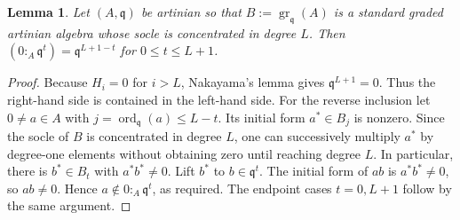 \documentclass[11pt,a4paper]{amsart}
\numberwithin{equation}{section}
\newtheorem{lemma}[theorem]{Lemma}
\newcommand{\gr}{\operatorname{gr}}
\newcommand{\ord}{\operatorname{ord}}
\begin{document}
 \begin{lemma} \label{lem:filtered}
 	Let $(A,\mathfrak q)$ be  artinian  so that
 	$B:=\gr_{\mathfrak q}(A)$ is a standard graded artinian algebra
 	whose socle is concentrated in degree $L$.
 	Then
 	$ (	0:_A\mathfrak q^t)=\mathfrak q^{L+1-t}$
 	for $0\leq t\leq L+1$.
 \end{lemma}
 \begin{proof}
 	Because $H_i=0$ for $i>L$, Nakayama's lemma gives
 	$\mathfrak q^{L+1}=0$.  Thus the right-hand side is contained
 	in the left-hand side.  For the reverse inclusion let
 	$0\neq a\in A$ with $j=\ord_{\mathfrak q}(a)\leq L-t$.
 	Its initial form $a^*\in B_j$ is nonzero.  Since the socle
 	of $B$ is concentrated in degree $L$, one can successively
 	multiply $a^*$ by degree-one elements without obtaining zero
 	until reaching degree $L$.  In particular, there is
 	$b^*\in B_t$ with $a^*b^*\neq0$.
 	Lift $b^*$ to $b\in\mathfrak q^t$.  The initial form of $ab$
 	is $a^*b^*\neq0$, so $ab\neq0$.
 	Hence $a\notin0:_A\mathfrak q^t$, as required.
 	The endpoint cases $t=0,L+1$ follow by the same argument.
 \end{proof}
 
\end{document}

